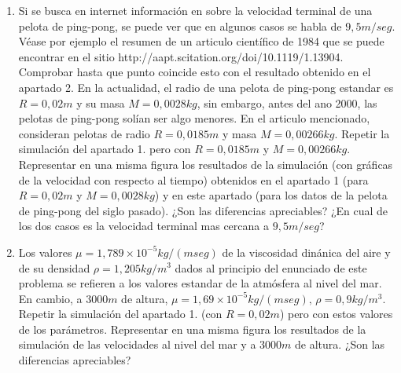 \documentclass[12pt,a4paper]{article}
\begin{document}
\begin{enumerate}
\item
Si se busca en internet información en sobre la velocidad terminal de una pelota de ping-pong, se puede ver que en algunos casos se habla de $9,5m/seg$. Véase por ejemplo el resumen de un articulo científico de 1984 que se puede encontrar en el sitio http://aapt.scitation.org/doi/10.1119/1.13904. Comprobar hasta que punto coincide esto con el resultado obtenido en el apartado 2. En la actualidad, el radio de una pelota de ping-pong estandar es $R = 0,02 m$ y su masa $M = 0,0028 kg$, sin embargo, antes del ano 2000, las pelotas de ping-pong solían ser algo menores. En el articulo mencionado, consideran pelotas de radio $R = 0,0185m$ y masa $M = 0,00266kg$. Repetir la simulación del apartado 1. pero con $R = 0,0185m$ y $M = 0,00266kg$. Representar en una misma figura los resultados de la simulación (con gráficas de la velocidad con respecto al tiempo) obtenidos en el apartado 1 (para $R = 0,02m$ y $M = 0,0028 kg$) y en este apartado (para los datos de la pelota de ping-pong del siglo pasado). ¿Son las diferencias apreciables? ¿En cual de los dos casos es la velocidad terminal mas cercana a $9,5 m/seg$?

\item
Los valores $\mu = 1,789 \times 10^{-5} kg/(m seg)$ de la viscosidad dinánica del aire y de su densidad $\rho = 1,205 kg/m^{3}$ dados al principio del enunciado de este problema se refieren a los valores estandar de la atmósfera al nivel del mar. En cambio, a $3000 m$ de altura, $\mu = 1,69 \times 10^{-5} kg/(m seg),\, \rho = 0,9 kg/m^{3}$. Repetir la simulación del apartado 1. (con $R = 0,02 m$) pero con estos valores de los parámetros. Representar en una misma figura los resultados de la simulación de las velocidades al nivel del mar y a $3000 m$ de altura. ¿Son las diferencias apreciables?

\end{enumerate}
\end{document}
